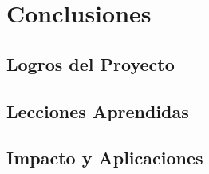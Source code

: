 \chapter{Conclusiones}
\section{Logros del Proyecto}
\section{Lecciones Aprendidas}
\section{Impacto y Aplicaciones}
